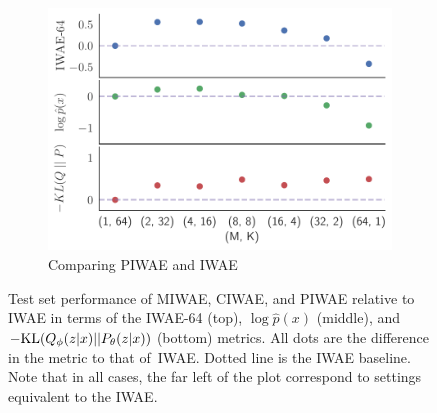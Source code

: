 \begin{figure}[t!]
\begin{subfigure}[b]{0.33\textwidth}
		\includegraphics[width=\textwidth]{figures/tighter_bounds/combinations_piwae}
		\caption{Comparing \gls{PIWAE} and \gls{IWAE} \label{fig:mnistexpt/dotplot/piwae}}
	\end{subfigure} \vspace{-12pt}
	\caption{Test set performance of \gls{MIWAE}, \gls{CIWAE}, and \gls{PIWAE} relative to \gls{IWAE} in terms of the \gls{IWAE}-64 (top), $\log \hat p(x)$ (middle), and $-\mathrm{KL}(Q_{\phi}(z \lvert x) || P_{\theta}(z \lvert x))$ (bottom) metrics.  All dots are the difference in the metric to that of~\gls{IWAE}. Dotted line is the \gls{IWAE} baseline.
		Note that in all cases, the far left of the plot correspond to
		settings equivalent to the \gls{IWAE}.\vspace{-8pt} 	 \label{fig:mnistexpt/dotplot}}
\end{figure}

